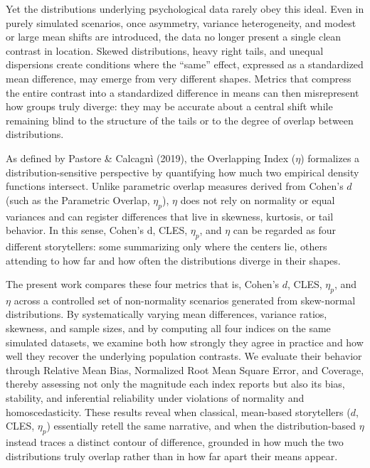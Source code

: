 \documentclass[
  12pt,
  a4paper,
  DIV=11,
  numbers=noendperiod]{scrartcl}
\begin{document}
Yet the distributions underlying psychological data rarely obey this
ideal. Even in purely simulated scenarios, once asymmetry, variance
heterogeneity, and modest or large mean shifts are introduced, the data
no longer present a single clean contrast in location. Skewed
distributions, heavy right tails, and unequal dispersions create
conditions where the ``same'' effect, expressed as a standardized mean
difference, may emerge from very different shapes. Metrics that compress
the entire contrast into a standardized difference in means can then
misrepresent how groups truly diverge: they may be accurate about a
central shift while remaining blind to the structure of the tails or to
the degree of overlap between distributions.

As defined by Pastore \& Calcagnì (2019), the Overlapping Index
(\(\eta\)) formalizes a distribution-sensitive perspective by
quantifying how much two empirical density functions intersect. Unlike
parametric overlap measures derived from Cohen's \(d\) (such as the
Parametric Overlap, \(\eta_p\)), \(\eta\) does not rely on normality or
equal variances and can register differences that live in skewness,
kurtosis, or tail behavior. In this sense, Cohen's d, CLES, \(\eta_p\),
and \(\eta\) can be regarded as four different storytellers: some
summarizing only where the centers lie, others attending to how far and
how often the distributions diverge in their shapes.

The present work compares these four metrics that is, Cohen's \(d\),
CLES, \(\eta_p\), and \(\eta\) across a controlled set of non-normality
scenarios generated from skew-normal distributions. By systematically
varying mean differences, variance ratios, skewness, and sample sizes,
and by computing all four indices on the same simulated datasets, we
examine both how strongly they agree in practice and how well they
recover the underlying population contrasts. We evaluate their behavior
through Relative Mean Bias, Normalized Root Mean Square Error, and
Coverage, thereby assessing not only the magnitude each index reports
but also its bias, stability, and inferential reliability under
violations of normality and homoscedasticity. These results reveal when
classical, mean-based storytellers (\(d\), CLES, \(\eta_p\)) essentially
retell the same narrative, and when the distribution-based \(\eta\)
instead traces a distinct contour of difference, grounded in how much
the two distributions truly overlap rather than in how far apart their
means appear.
\end{document}
